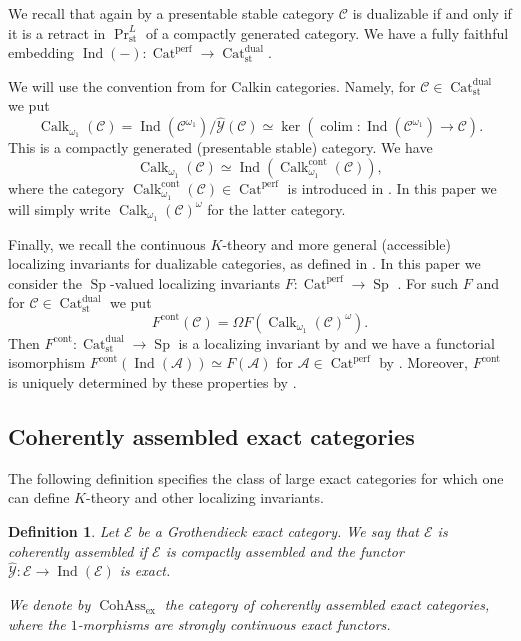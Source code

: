 \documentclass[11pt,leqno]{amsart}
\newtheorem{defi}[theo]{Definition}
\numberwithin{equation}{section}
\DeclareMathOperator*{\colim}{colim}
\newcommand{\Cat}{\operatorname{Cat}}
\newcommand{\cont}{\operatorname{cont}}
\newcommand{\ex}{\operatorname{ex}}
\newcommand{\st}{\operatorname{st}}
\newcommand{\dual}{\operatorname{dual}}
\newcommand{\cA}{{\mathcal A}}
\newcommand{\cC}{{\mathcal C}}
\newcommand{\cE}{{\mathcal E}}
\newcommand{\cY}{{\mathcal Y}}
\newcommand{\Cohass}{\operatorname{CohAss}}
\newcommand{\perf}{\operatorname{perf}}
\newcommand{\Sp}{\operatorname{Sp}}
\newcommand{\Ind}{\operatorname{Ind}}
\newcommand{\Calk}{\operatorname{Calk}}
\begin{document}
We recall that again by \cite[Proposition D.7.3.1]{Lur18} a presentable stable category $\cC$ is dualizable if and only if it is a retract in $\Pr^L_{\st}$ of a compactly generated category. We have a fully faithful embedding $\Ind(-):\Cat^{\perf}\to\Cat_{\st}^{\dual}.$

We will use the convention from \cite{E25c} for Calkin categories. Namely, for $\cC\in\Cat_{\st}^{\dual}$ we put
\begin{equation*}
\Calk_{\omega_1}(\cC)=\Ind(\cC^{\omega_1})/\hat{\cY}(\cC)\simeq\ker(\colim:\Ind(\cC^{\omega_1})\to\cC).
\end{equation*}
This is a compactly generated (presentable stable) category. We have
\begin{equation*}
\Calk_{\omega_1}(\cC)\simeq\Ind(\Calk_{\omega_1}^{\cont}(\cC)),
\end{equation*}
where the category $\Calk_{\omega_1}^{\cont}(\cC)\in\Cat^{\perf}$ is introduced in \cite[Definition 1.60]{E24}. In this paper we will simply write $\Calk_{\omega_1}(\cC)^{\omega}$ for the latter category.

Finally, we recall the continuous $K$-theory and more general (accessible) localizing invariants for dualizable categories, as defined in \cite{E24}. In this paper we consider the $\Sp$-valued localizing invariants $F:\Cat^{\perf}\to\Sp$ \cite{BGT}. For such $F$ and for $\cC\in\Cat_{\st}^{\dual}$ we put
\begin{equation*}
F^{\cont}(\cC)=\Omega F(\Calk_{\omega_1}(\cC)^{\omega}).
\end{equation*} 
Then $F^{\cont}:\Cat_{\st}^{\dual}\to\Sp$ is a localizing invariant by \cite[Proposition 4.6]{E24} and we have a functorial isomorphism $F^{\cont}(\Ind(\cA))\simeq F(\cA)$ for $\cA\in\Cat^{\perf}$ by \cite[Proposition 4.7]{E24}. Moreover, $F^{\cont}$ is uniquely determined by these properties by \cite[Theorem 4.10]{E24}.

\subsection{Coherently assembled exact categories}
\label{ssec:coh_ass_exact_cats}

The following definition specifies the class of large exact categories for which one can define $K$-theory and other localizing invariants.

\begin{defi}\label{def:coherently_assembled_exact}
Let $\cE$ be a Grothendieck exact category. We say that $\cE$ is coherently assembled if $\cE$ is compactly assembled and the functor $\hat{\cY}:\cE\to\Ind(\cE)$ is exact.

We denote by $\Cohass_{\ex}$ the category of coherently assembled exact categories, where the $1$-morphisms are strongly continuous exact functors. 
\end{defi}
\end{document}

